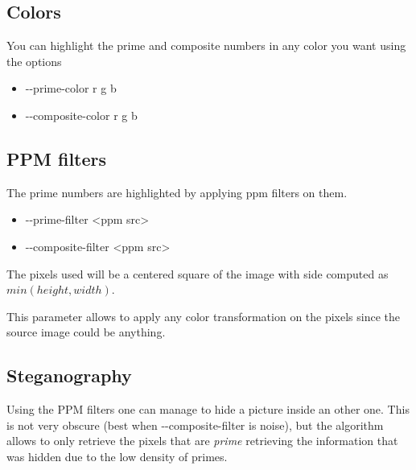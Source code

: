 \subsection{Colors}
You can highlight the prime and composite numbers in any color you want using the options

\begin{itemize}
	\item{-{}-prime-color r g b}
	\item{-{}-composite-color r g b}
\end{itemize}

\subsection{PPM filters}
The prime numbers are highlighted by applying ppm filters on them.

\begin{itemize}
	\item{-{}-prime-filter <ppm src>}
	\item{-{}-composite-filter <ppm src>}
\end{itemize}

The pixels used will be a centered square of the image with side computed as $min(height, width)$.

This parameter allows to apply any color transformation on the pixels since the source image could be anything.


\subsection{Steganography}
Using the PPM filters one can manage to hide a picture inside an other one. This is not very obscure (best when -{}-composite-filter is noise), but the algorithm allows to only retrieve the pixels that are \emph{prime} retrieving the information that was hidden due to the low density of primes.


